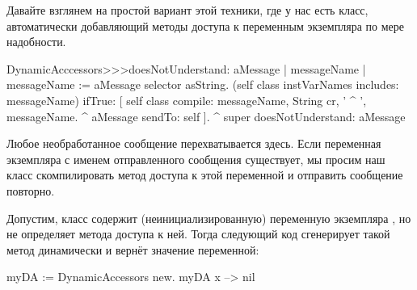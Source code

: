 \documentclass[a4paper,10pt,twoside]{book}
\begin{document}
{%

Давайте взглянем на простой вариант этой техники, где у нас есть класс, автоматически добавляющий методы доступа к переменным экземпляра по мере надобности.

\begin{code}{}
DynamicAcccessors>>>doesNotUnderstand: aMessage
	| messageName |
	messageName := aMessage selector asString.
	(self class instVarNames includes: messageName)
		ifTrue: [
			self class compile: messageName, String cr, ' ^ ', messageName.
			^ aMessage sendTo: self ].
	^ super doesNotUnderstand: aMessage
\end{code}
Любое необработанное сообщение перехватывается здесь. Если переменная экземпляра с именем отправленного сообщения существует, мы просим наш класс скомпилировать метод доступа к этой переменной и отправить сообщение повторно.

Допустим,  класс  содержит (неинициализированную) переменную экземпляра , но не определяет метода доступа к ней. Тогда следующий код сгенерирует такой метод динамически и вернёт значение переменной:
\begin{code}{}
myDA := DynamicAccessors new.
myDA x --> nil
\end{code}

}
\end{document}
